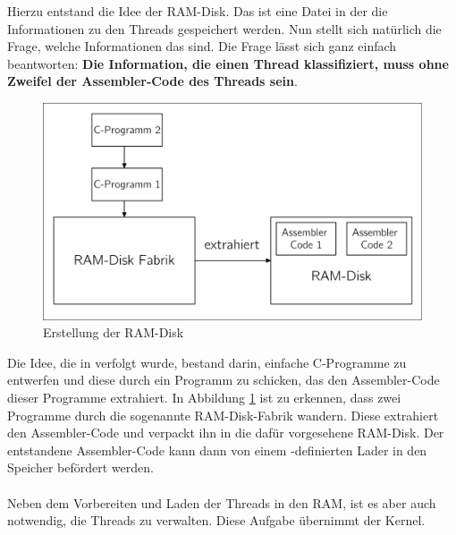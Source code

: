 Hierzu entstand die Idee der RAM-Disk. Das ist eine Datei in der die Informationen zu den Threads gespeichert werden. Nun stellt sich nat\"urlich die Frage, welche Informationen das sind. Die Frage l\"asst sich ganz einfach beantworten: \textbf{Die Information, die einen Thread klassifiziert, muss ohne Zweifel der Assembler-Code des Threads sein}. 
\newpage
\begin{figure}[h!]
	\centering
	\includegraphics[scale=0.60]{common/draft-thread-ramdisk.pdf}	
	\caption{Erstellung der RAM-Disk}
	\label{draft:draft-thread-ramdisk}
\end{figure}
\noindent
Die Idee, die in \mops verfolgt wurde, bestand darin, einfache C-Programme zu entwerfen und diese durch ein Programm zu schicken, das den Assembler-Code dieser Programme extrahiert. In Abbildung \ref{draft:draft-thread-ramdisk} ist zu erkennen, dass zwei Programme durch die sogenannte RAM-Disk-Fabrik wandern. Diese extrahiert den Assembler-Code und verpackt ihn in die daf\"ur vorgesehene RAM-Disk. Der entstandene Assembler-Code kann dann von einem \mops -definierten Lader in den Speicher bef\"ordert werden.\\\\
Neben dem Vorbereiten und Laden der Threads in den RAM, ist es aber auch notwendig, die Threads zu verwalten. Diese Aufgabe \"ubernimmt der Kernel.
